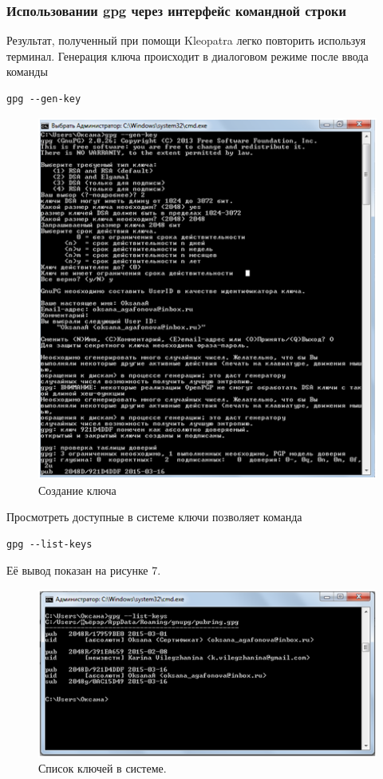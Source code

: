 \documentclass[10pt,a4paper]{article}
\begin{document}
\subsubsection{Использовании gpg через интерфейс командной строки}

\hspace{0,6cm}Результат, полученный при помощи Kleopatra легко повторить используя терминал. Генерация ключа происходит в диалоговом режиме после ввода команды
\begin{verbatim}
gpg --gen-key
\end{verbatim}

\begin{figure}[h!]
\centering
\includegraphics[scale=0.67]{res/Sertifikat3}
\caption{Создание ключа}
\end{figure}

\hspace{0,6cm}Просмотреть доступные в системе ключи позволяет команда
\begin{verbatim}gpg --list-keys
\end{verbatim}
Её вывод показан на рисунке 7.

\begin{figure}[h!]
\centering
\includegraphics[scale=0.8]{res/Spisok}
\caption{Список ключей в системе.}
\end{figure}
\end{document}
